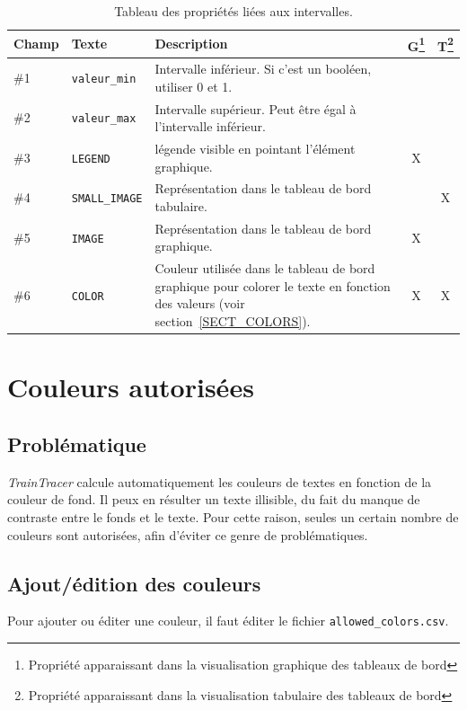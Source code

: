 \documentclass{AlstomLibrary}
\newcommand{\progname}[1]{\textit{#1}}
\newcommand{\INTERVLEGEND}{\index{Propriétés d'intervalle!LEGEND}\texttt{LEGEND}}
\newcommand{\TT}{{\progname{TrainTracer}} }
\begin{document}
\begin{table}\centering
\begin{tabular}{@{}llp{7cm}cc}  \toprule%
Champ & Texte & Description & G\footnote{Propriété apparaissant dans la visualisation graphique des tableaux de bord} & T\footnote{Propriété apparaissant dans la visualisation tabulaire des tableaux de bord} \\
\midrule
\#1 & \texttt{valeur\_min}  & Intervalle inférieur. Si c'est un booléen, utiliser 0 et 1. & & \\
\#2 & \texttt{valeur\_max}  & Intervalle supérieur. Peut être égal à l'intervalle inférieur. & & \\
\#3 & \INTERVLEGEND  & légende visible en pointant l'élément graphique. & X & \\
\#4 & \texttt{SMALL\_IMAGE}  & Représentation dans le tableau de bord tabulaire. & & X \\
\#5 & \texttt{IMAGE} &  Représentation dans le tableau de bord graphique. & X & \\
\#6 & \texttt{COLOR} &  Couleur utilisée dans le tableau de bord graphique pour colorer le texte en fonction des valeurs (voir section~\vref{SECT_COLORS}). & X & X \\
\bottomrule
\end{tabular}
\caption{Tableau des propriétés liées aux intervalles.}\label{TAB_PROPS_INTERVAL}
\end{table}

\section{Couleurs autorisées} \label{SECT_COLORS}

\subsection{Problématique}

\TT calcule automatiquement les couleurs de textes en fonction de la couleur de fond. Il peux en résulter un texte illisible, du fait du manque de contraste entre le fonds et le texte. Pour cette raison, seules un certain nombre de couleurs sont autorisées, afin d'éviter ce genre de problématiques.

\subsection{Ajout/édition des couleurs}

Pour ajouter ou éditer une couleur, il faut éditer le fichier \texttt{allowed\_colors.csv}.
\end{document}
